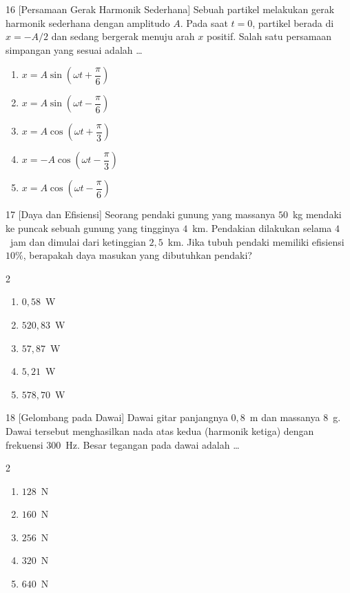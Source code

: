 \documentclass[11pt]{article}
\newenvironment{pil}{%
  \begin{enumerate}[label=(\alph*),leftmargin=*,itemsep=1pt,topsep=3pt]}%
  {\end{enumerate}}
\newenvironment{pilB}{%
  \par\smallskip\begin{multicols}{2}
  \begin{enumerate}[label=(\alph*),leftmargin=*,itemsep=1pt,topsep=3pt]}%
  {\end{enumerate}\end{multicols}}
\begin{document}
\begin{soal}{16 \normalfont\small[Persamaan Gerak Harmonik Sederhana]}
Sebuah partikel melakukan gerak harmonik sederhana dengan amplitudo $A$. Pada saat $t=0$,
partikel berada di $x=-A/2$ dan sedang bergerak menuju arah $x$ positif. Salah satu
persamaan simpangan yang sesuai adalah \ldots
\begin{pil}
  \item $x=A\sin\!\left(\omega t+\dfrac{\pi}{6}\right)$
  \item $x=A\sin\!\left(\omega t-\dfrac{\pi}{6}\right)$
  \item $x=A\cos\!\left(\omega t+\dfrac{\pi}{3}\right)$
  \item $x=-A\cos\!\left(\omega t-\dfrac{\pi}{3}\right)$
  \item $x=A\cos\!\left(\omega t-\dfrac{\pi}{6}\right)$
\end{pil}
\end{soal}

\begin{soal}{17 \normalfont\small[Daya dan Efisiensi]}
Seorang pendaki gunung yang massanya $50$~kg mendaki ke puncak sebuah gunung yang
tingginya $4$~km. Pendakian dilakukan selama $4$~jam dan dimulai dari ketinggian $2{,}5$~km.
Jika tubuh pendaki memiliki efisiensi $10\%$, berapakah daya masukan yang dibutuhkan
pendaki?
\begin{pilB}
  \item $0{,}58$~W \item $520{,}83$~W \item $57{,}87$~W \item $5{,}21$~W \item $578{,}70$~W
\end{pilB}
\end{soal}

\begin{soal}{18 \normalfont\small[Gelombang pada Dawai]}
Dawai gitar panjangnya $0{,}8$~m dan massanya $8$~g. Dawai tersebut menghasilkan nada
atas kedua (harmonik ketiga) dengan frekuensi $300$~Hz. Besar tegangan pada dawai
adalah \ldots
\begin{pilB}
  \item $128$~N \item $160$~N \item $256$~N \item $320$~N \item $640$~N
\end{pilB}
\end{soal}
\end{document}
